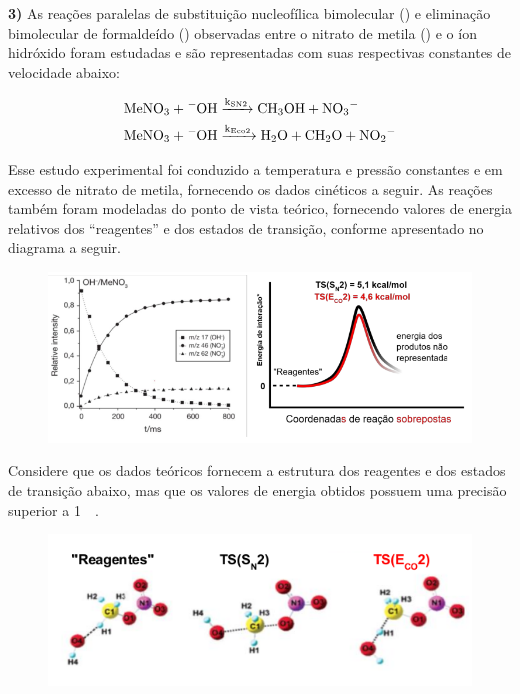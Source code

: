 \textbf{3)} As reações paralelas de substituição nucleofílica bimolecular () e eliminação bimolecular de formaldeído () observadas entre o nitrato de metila () e o íon hidróxido foram estudadas e são representadas com suas respectivas constantes de velocidade abaixo:

\begin{align*}
    \ce{MeNO3 + ^-OH &->[{k_{SN 2}}] CH3OH + NO3^-} \\
    \ce{MeNO3 + ^-OH &->[{k_{Eco 2}}] H2O + CH2O + NO2^-}
\end{align*}

Esse estudo experimental foi conduzido a temperatura e pressão constantes e em excesso de nitrato de metila, fornecendo os dados cinéticos a seguir. As reações também foram modeladas do ponto de vista teórico, fornecendo valores de energia relativos dos ``reagentes'' e dos estados de transição, conforme apresentado no diagrama a seguir.

\begin{figure}[H]
    \centering
    \includegraphics[width=\textwidth]{fig/diagramQ3}
\end{figure}

Considere que os dados teóricos fornecem a estrutura dos reagentes e dos estados de transição abaixo, mas que os valores de energia obtidos possuem uma precisão superior a \qty{1}{\kilo\calorie}.

\begin{figure}[H]
    \centering
    \includegraphics[width=.8\linewidth]{fig/estadosTQ3}
\end{figure}

